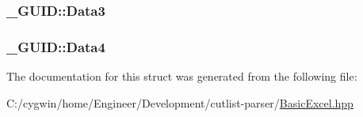 \subsubsection[{Data3}]{ \+\_\+\+G\+U\+I\+D\+::\+Data3}\label{struct___g_u_i_d_a763787bcc60573c8d61bb4db4ba98a10}
\hypertarget{struct___g_u_i_d_ac58e12d266b867e4f7a4bb52e2476abd}{}
\subsubsection[{Data4}]{ \+\_\+\+G\+U\+I\+D\+::\+Data4}\label{struct___g_u_i_d_ac58e12d266b867e4f7a4bb52e2476abd}


The documentation for this struct was generated from the following file\+:\begin{DoxyCompactItemize}
\item 
C\+:/cygwin/home/\+Engineer/\+Development/cutlist-\/parser/\hyperlink{_basic_excel_8hpp}{Basic\+Excel.\+hpp}\end{DoxyCompactItemize}
